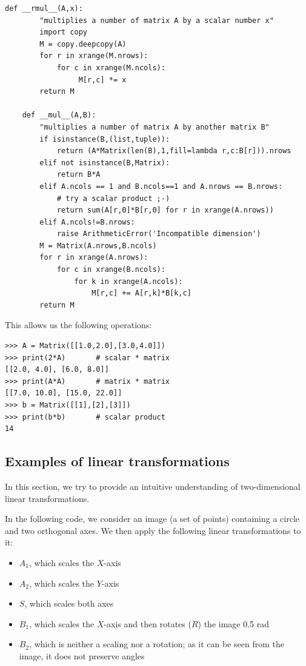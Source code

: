 \documentclass[justified,sixbynine]{tufte-book}
\def\ft{\small\tt}
\theoremstyle{plain}%
\theoremstyle{definition}
\theoremstyle{remark}
\begin{document}
\begin{fullwidth}
\begin{lstlisting}[caption={in file: {\ft nlib.py}}]
    def __rmul__(A,x):
        "multiplies a number of matrix A by a scalar number x"
        import copy
        M = copy.deepcopy(A)
        for r in xrange(M.nrows):
            for c in xrange(M.ncols):
                 M[r,c] *= x
        return M

    def __mul__(A,B):
        "multiplies a number of matrix A by another matrix B"
        if isinstance(B,(list,tuple)):
            return (A*Matrix(len(B),1,fill=lambda r,c:B[r])).nrows
        elif not isinstance(B,Matrix):
            return B*A
        elif A.ncols == 1 and B.ncols==1 and A.nrows == B.nrows:
            # try a scalar product ;-)
            return sum(A[r,0]*B[r,0] for r in xrange(A.nrows))
        elif A.ncols!=B.nrows:
            raise ArithmeticError('Incompatible dimension')
        M = Matrix(A.nrows,B.ncols)
        for r in xrange(A.nrows):
            for c in xrange(B.ncols):
                for k in xrange(A.ncols):
                    M[r,c] += A[r,k]*B[k,c]
        return M
\end{lstlisting}

This allows us the following operations:
\begin{lstlisting}[caption={in file: {\ft nlib.py}}]
>>> A = Matrix([[1.0,2.0],[3.0,4.0]])
>>> print(2*A)       # scalar * matrix
[[2.0, 4.0], [6.0, 8.0]]
>>> print(A*A)       # matrix * matrix
[[7.0, 10.0], [15.0, 22.0]]
>>> b = Matrix([[1],[2],[3]])
>>> print(b*b)       # scalar product
14
\end{lstlisting}


\goodbreak\subsection{Examples of linear transformations}


In this section, we try to provide an intuitive understanding of two-dimensional linear transformations.

In the following code, we consider an image (a set of points) containing a circle and two orthogonal axes. We then apply the following linear transformations to it:
\begin{itemize}
\item $A_1$, which scales the $X$-axis
\item $A_2$, which scales the $Y$-axis
\item $S$, which scales both axes
\item $B_1$, which scales the $X$-axis and then rotates ($R$) the image 0.5 rad
\item $B_2$, which is neither a scaling nor a rotation; as it can be seen from the image, it does not preserve angles
\end{itemize}


\end{fullwidth}
\end{document}
